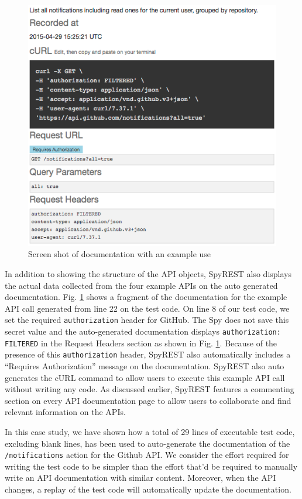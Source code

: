 \documentclass[conference]{IEEEtran}
\begin{document}
\begin{figure}[!tbh]
  \centering
  \includegraphics[width=\linewidth]{notification_example.png}
  \caption{Screen shot of documentation with an example use}
  \label{fig:notification_example}
\end{figure}

In addition to showing the structure of the API objects, SpyREST also displays the actual data collected from the four example APIs on the auto generated documentation. Fig. \ref{fig:notification_example} shows a fragment of the documentation for the example API call generated from line 22 on the test code. On line 8 of our test code, we set the required \texttt{authorization} header for GitHub. The Spy does not save this secret value and the auto-generated documentation displays \texttt{authorization: FILTERED} in the Request Headers section as shown in Fig. \ref{fig:notification_example}. Because of the presence of this \texttt{authorization} header, SpyREST also automatically includes a ``Requires Authorization'' message on the documentation. SpyREST also auto generates the cURL command to allow users to execute this example API call without writing any code. As discussed earlier, SpyREST features a commenting section on every API documentation page to allow users to collaborate and find relevant information on the APIs.

In this case study, we have shown how a total of 29 lines of executable test code, excluding blank lines, has been used to auto-generate the documentation of the \texttt{/notifications} action for the Github API. We consider the effort required for writing the test code to be simpler than the effort that'd be required to manually write an API documentation with similar content. Moreover, when the API changes, a replay of the test code will automatically update the documentation.
\end{document}

